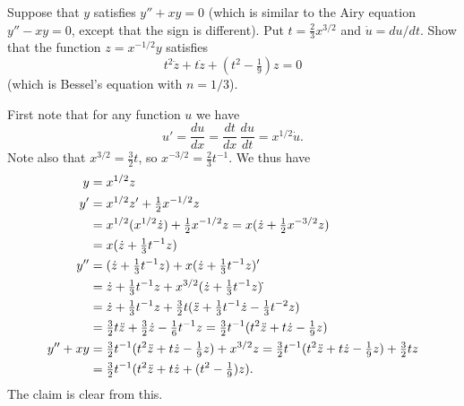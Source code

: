 \documentclass[a4paper]{amsart}
\begin{document}
\begin{exercise}\label{ex-transform-d}
 Suppose that $y$ satisfies $y''+xy=0$ (which is similar to the Airy
 equation $y''-xy=0$, except that the sign is different).  Put
 $t=\tfrac{2}{3}x^{3/2}$ and $\dot{u}=du/dt$.  Show that the function
 $z=x^{-1/2}y$ satisfies 
 \[ t^2\ddot{z}+t\dot{z}+(t^2-\tfrac{1}{9})z = 0 \]
 (which is Bessel's equation with $n=1/3$).
\end{exercise}
\begin{solution}
 First note that for any function $u$ we have
 \[ u' = \frac{du}{dx} = \frac{dt}{dx}\,\frac{du}{dt}
       = x^{1/2}\dot{u}.
 \]
 Note also that $x^{3/2}=\tfrac{3}{2}t$, so
 $x^{-3/2}=\tfrac{2}{3}t^{-1}$.  We thus have
 \begin{align*}
  y   &= x^{1/2} z \\
  y'  &= x^{1/2} z' + \tfrac{1}{2} x^{-1/2}z \\
      &= x^{1/2} (x^{1/2}\dot{z}) + \tfrac{1}{2} x^{-1/2}z
       = x(\dot{z}+\tfrac{1}{2} x^{-3/2}z) \\
      &= x(\dot{z}+\tfrac{1}{3}t^{-1}z) \\
  y'' &= (\dot{z}+\tfrac{1}{3}t^{-1}z) + 
         x(\dot{z}+\tfrac{1}{3}t^{-1}z)' \\
      &= \dot{z}+\tfrac{1}{3}t^{-1}z + 
         x^{3/2}(\dot{z}+\tfrac{1}{3}t^{-1}z)\dot{ } \\
      &= \dot{z}+\tfrac{1}{3}t^{-1}z + 
         \tfrac{3}{2}t(\ddot{z}+\tfrac{1}{3}t^{-1}\dot{z}-\tfrac{1}{3}t^{-2}z) \\
      &= \tfrac{3}{2}t\ddot{z} + \tfrac{3}{2}\dot{z} - \tfrac{1}{6}t^{-1}z 
       = \tfrac{3}{2}t^{-1}(t^2\ddot{z}+t\dot{z}-\tfrac{1}{9}z) \\
   y''+xy &= \tfrac{3}{2}t^{-1}(t^2\ddot{z}+t\dot{z}-\tfrac{1}{9}z) 
              + x^{3/2}z 
           = \tfrac{3}{2}t^{-1}(t^2\ddot{z}+t\dot{z}-\tfrac{1}{9}z) 
              + \tfrac{3}{2}tz \\
          &= \tfrac{3}{2}t^{-1}(t^2\ddot{z}+t\dot{z}+(t^2-\tfrac{1}{9})z). 
 \end{align*}
 The claim is clear from this.
\end{solution}
\end{document}
